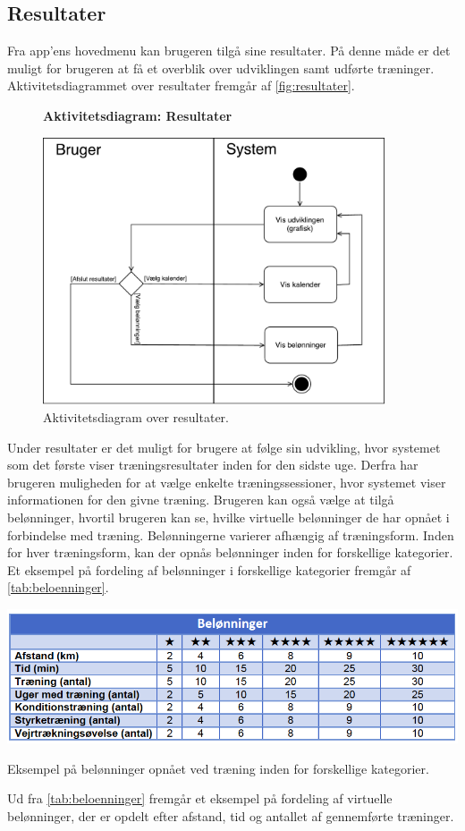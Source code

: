 \subsection*{Resultater}
Fra app'ens hovedmenu kan brugeren tilgå sine resultater. På denne måde er det muligt for brugeren at få et overblik over udviklingen samt udførte træninger.
Aktivitetsdiagrammet over resultater fremgår af \autoref{fig:resultater}.

\begin{figure} [H]
\centering
\textbf{Aktivitetsdiagram: Resultater}\par\medskip
\includegraphics[width=0.9\textwidth]{figures/aktivitetsdiagram/Resultater}
\caption{Aktivitetsdiagram over resultater.}
\label{fig:resultater}
\end{figure}

\noindent
Under resultater er det muligt for brugere at følge sin udvikling, hvor systemet som det første viser træningsresultater inden for den sidste uge. Derfra har brugeren muligheden for at vælge enkelte træningssessioner, hvor systemet viser informationen for den givne træning. 
Brugeren kan også vælge at tilgå belønninger, hvortil brugeren kan se, hvilke virtuelle belønninger de har opnået i forbindelse med træning. Belønningerne varierer afhængig af træningsform. Inden for hver træningsform, kan der opnås belønninger inden for forskellige kategorier. Et eksempel på fordeling af belønninger i forskellige kategorier fremgår af \autoref{tab:beloenninger}.

\begin{table} [H]
\centering
\includegraphics[width=1\textwidth]{figures/aktivitetsdiagram/beloeninnger}
\caption{Eksempel på belønninger opnået ved træning inden for forskellige kategorier.}
\label{tab:beloenninger}
\end{table}

\noindent
Ud fra \autoref{tab:beloenninger} fremgår et eksempel på fordeling af virtuelle belønninger, der er opdelt efter afstand, tid og antallet af gennemførte træninger. 